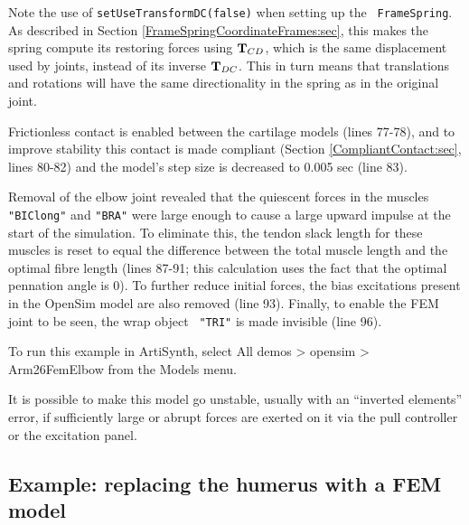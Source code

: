 \begin{sideblock}
Note the use of {\tt setUseTransformDC(false)} when setting up the {\tt
FrameSpring}. As described in Section \ref{FrameSpringCoordinateFrames:sec},
this makes the spring compute its restoring forces using ${\bf T}_{CD}$, which is
the same displacement used by joints, instead of its inverse ${\bf T}_{DC}$.  This
in turn means that translations and rotations will have the same directionality
in the spring as in the original joint.
\end{sideblock}

Frictionless contact is enabled between the cartilage models (lines 77-78), and
to improve stability this contact is made compliant
(Section \ref{CompliantContact:sec}, lines 80-82) and the model's step size is
decreased to 0.005 sec (line 83).

Removal of the elbow joint revealed that the quiescent forces in the muscles
{\tt "BIClong"} and {\tt "BRA"} were large enough to cause a large upward
impulse at the start of the simulation. To eliminate this, the tendon slack
length for these muscles is reset to equal the difference between the total
muscle length and the optimal fibre length (lines 87-91; this calculation uses
the fact that the optimal pennation angle is 0). To further reduce initial
forces, the bias excitations present in the OpenSim model are also removed
(line 93). Finally, to enable the FEM joint to be seen, the wrap object {\tt
"TRI"} is made invisible (line 96).

To run this example in ArtiSynth, select {\sf All demos > opensim >
Arm26FemElbow} from the {\sf Models} menu.

\begin{sideblock}
It is possible to make this model go unstable, usually with an ``inverted
elements'' error, if sufficiently large or abrupt forces are exerted on it via
the pull controller or the excitation panel.
\end{sideblock}

\subsection{Example: replacing the humerus with a FEM model}
\label{Arm26FemHumerus:sec}


